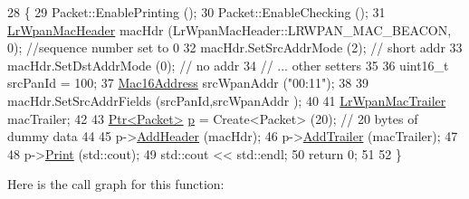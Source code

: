 \begin{DoxyCode}
28 \{
29   Packet::EnablePrinting ();
30   Packet::EnableChecking ();
31   \hyperlink{classns3_1_1LrWpanMacHeader}{LrWpanMacHeader} macHdr (LrWpanMacHeader::LRWPAN\_MAC\_BEACON, 0);        \textcolor{comment}{//sequence number
       set to 0}
32   macHdr.SetSrcAddrMode (2);                                             \textcolor{comment}{// short addr}
33   macHdr.SetDstAddrMode (0);                                             \textcolor{comment}{// no addr}
34   \textcolor{comment}{// ... other setters}
35 
36   uint16\_t srcPanId = 100;
37   \hyperlink{classns3_1_1Mac16Address}{Mac16Address} srcWpanAddr (\textcolor{stringliteral}{"00:11"});
38 
39   macHdr.SetSrcAddrFields (srcPanId,srcWpanAddr );
40 
41   \hyperlink{classns3_1_1LrWpanMacTrailer}{LrWpanMacTrailer} macTrailer;
42 
43   \hyperlink{classns3_1_1Ptr}{Ptr<Packet>} \hyperlink{lte__link__budget_8m_ac9de518908a968428863f829398a4e62}{p} = Create<Packet> (20);  \textcolor{comment}{// 20 bytes of dummy data}
44 
45   p->\hyperlink{classns3_1_1Packet_a465108c595a0bc592095cbcab1832ed8}{AddHeader} (macHdr);
46   p->\hyperlink{classns3_1_1Packet_ae26b490c30ae5bc98be5181ec6e06db8}{AddTrailer} (macTrailer);
47 
48   p->\hyperlink{classns3_1_1Packet_aa34058a5cdbf94673531f8c4001ab227}{Print} (std::cout);
49   std::cout << std::endl;
50   \textcolor{keywordflow}{return} 0;
51 
52 \}
\end{DoxyCode}


Here is the call graph for this function\+:


